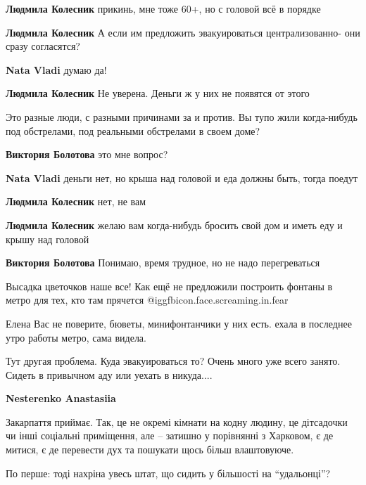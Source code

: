 \begin{itemize}
\begin{itemize}
\textbf{Людмила Колесник} прикинь, мне тоже 60+, но с головой всё в порядке

\textbf{Людмила Колесник} А если им предложить эвакуироваться централизованно- они сразу согласятся?

\textbf{Nata Vladi} думаю да!

\textbf{Людмила Колесник} Не уверена. Деньги ж у них не появятся от этого

Это разные люди, с разными причинами за и против. Вы тупо жили когда-нибудь под обстрелами, под реальными обстрелами в своем доме?

\textbf{Виктория Болотова} это мне вопрос?

\textbf{Nata Vladi} деньги нет, но крыша над головой и еда должны быть, тогда поедут

\textbf{Людмила Колесник} нет, не вам

\textbf{Людмила Колесник} желаю вам когда-нибудь бросить свой дом и иметь еду и крышу над головой

\textbf{Виктория Болотова} Понимаю, время трудное, но не надо перегреваться
\end{itemize} %


Высадка цветочков наше все! Как ещё не предложили построить фонтаны в метро для
тех, кто там прячется @igg{fbicon.face.screaming.in.fear} 


Елена Вас не поверите, бюветы, минифонтанчики у них есть. ехала в последнее
утро работы метро, сама видела.


Тут другая проблема. Куда эвакуироваться то? Очень много уже всего занято.
Сидеть в привычном аду или уехать в никуда....

\textbf{Nesterenko Anastasiia} 

Закарпаття приймає. Так, це не окремі кімнати на кодну людину, це дітсадочки чи
інші соціальні приміщення, але -- затишно у порівнянні з Харковом, є де митися,
є де перевести дух та пошукати щось більш влаштовуюче.

По перше: тоді нахріна увесь штат, що сидить у більшості на \enquote{удальонці}?


\end{itemize}
